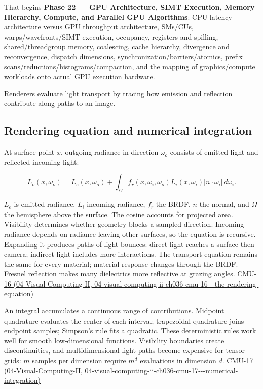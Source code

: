 That begins \textbf{Phase 22 --- GPU Architecture, SIMT Execution, Memory Hierarchy, Compute, and Parallel GPU Algorithms}: CPU latency architecture versus GPU throughput architecture, SMs/CUs, warps/wavefronts/SIMT execution, occupancy, registers and spilling, shared/threadgroup memory, coalescing, cache hierarchy, divergence and reconvergence, dispatch dimensions, synchronization/barriers/atomics, prefix scans/reductions/histograms/compaction, and the mapping of graphics/compute workloads onto actual GPU execution hardware.

Renderers evaluate light transport by tracing how emission and reflection contribute along paths to an image.

\subsection{Rendering equation and numerical integration}\label{03-visual-computing-i-ch011-rendering-equation-and-numerical-integration}

At surface point \(x\), outgoing radiance in direction \(\omega_o\) consists of emitted light and reflected incoming light:

\[
L_o(x,\omega_o)=L_e(x,\omega_o)+\int_\Omega f_r(x,\omega_i,\omega_o)L_i(x,\omega_i)|n\cdot\omega_i|\,d\omega_i.
\]

\(L_e\) is emitted radiance, \(L_i\) incoming radiance, \(f_r\) the BRDF, \(n\) the normal, and \(\Omega\) the hemisphere above the surface. The cosine accounts for projected area. Visibility determines whether geometry blocks a sampled direction. Incoming radiance depends on radiance leaving other surfaces, so the equation is recursive. Expanding it produces paths of light bounces: direct light reaches a surface then camera; indirect light includes more interactions. The transport equation remains the same for every material; material response changes through the BRDF. Fresnel reflection makes many dielectrics more reflective at grazing angles. \href{../04-Visual-Computing-II/main.pdf\#nameddest=04-visual-computing-ii-ch036-cmu-16---the-rendering-equation}{CMU-16 (04-Visual-Computing-II, 04-visual-computing-ii-ch036-cmu-16-\/-\/-the-rendering-equation)}

An integral accumulates a continuous range of contributions. Midpoint quadrature evaluates the center of each interval; trapezoidal quadrature joins endpoint samples; Simpson's rule fits a quadratic. These deterministic rules work well for smooth low-dimensional functions. Visibility boundaries create discontinuities, and multidimensional light paths become expensive for tensor grids: \(m\) samples per dimension require \(m^d\) evaluations in dimension \(d\). \href{../04-Visual-Computing-II/main.pdf\#nameddest=04-visual-computing-ii-ch036-cmu-17---numerical-integration}{CMU-17 (04-Visual-Computing-II, 04-visual-computing-ii-ch036-cmu-17-\/-\/-numerical-integration)}

